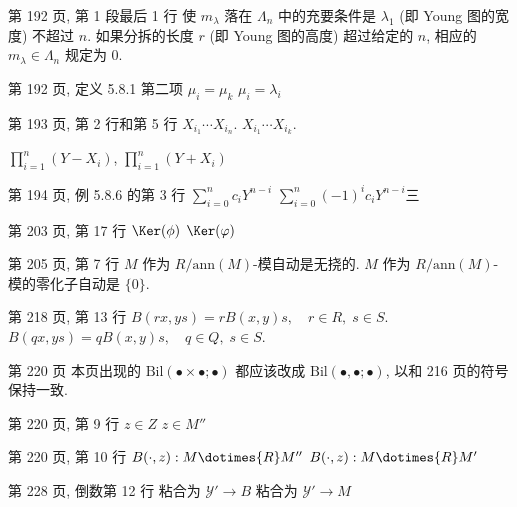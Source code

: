 \documentclass{AJerrata}
\begin{document}
\begin{Errata}
		\item[第 192 页, 第 1 段最后 1 行]
		\Orig 使 $m_\lambda$ 落在 $\Lambda_n$ 中的充要条件是 $\lambda_1$ (即 Young 图的宽度) 不超过 $n$.
		\Corr 如果分拆的长度 $r$ (即 Young 图的高度) 超过给定的 $n$, 相应的 $m_\lambda \in \Lambda_n$ 规定为 $0$.
		
		\item[第 192 页, 定义 5.8.1 第二项]
		\Orig $\mu_i = \mu_k$
		\Corr $\mu_i = \lambda_i$
		
		\item[第 193 页, 第 2 行和第 5 行]
		\Orig $X_{i_1} \cdots X_{i_n}$.
		\Corr $X_{i_1} \cdots X_{i_k}$.
		
		\Orig $\prod_{i=1}^n (Y - X_i)$,
		\Corr $\prod_{i=1}^n (Y + X_i)$
				
		\item[第 194 页, 例 5.8.6 的第 3 行]
		\Orig $\sum_{i=0}^n c_i Y^{n-i}$
		\Corr $\sum_{i=0}^n (-1)^i c_i Y^{n-i}$三
		
		\item[第 203 页, 第 17 行]
		\Orig $\Ker(\phi)$
		\Corr $\Ker(\varphi)$

   		\item[第 205 页, 第 7 行]
		\Orig $M$ 作为 $R/\mathrm{ann}(M)$-模自动是无挠的.
		\Corr $M$ 作为 $R/\mathrm{ann}(M)$-模的零化子自动是 $\{0\}$.

        \item[第 218 页, 第 13 行]
        \Orig $B(rx, ys) = rB(x,y)s, \quad r \in R, \; s \in S$.
        \newline
        \Corr $B(qx, ys) = qB(x,y)s, \quad q \in Q, \; s \in S$.

        \item[第 220 页]
        本页出现的 $\mathrm{Bil}(\bullet \times \bullet; \bullet)$ 都应该改成 $\mathrm{Bil}(\bullet, \bullet; \bullet)$, 以和 216 页的符号保持一致.
        
        \item[第 220 页, 第 9 行]
        \Orig $z \in Z$
        \Corr $z \in M''$
        
        \item[第 220 页, 第 10 行]
        \Orig $B(\cdot, z): M \dotimes{R} M''$
        \Corr $B(\cdot, z): M \dotimes{R} M'$
        
        \item[第 228 页, 倒数第 12 行]
        \Orig 粘合为 $\mathcal{Y}' \to B$
        \Corr 粘合为 $\mathcal{Y}' \to M$
       

\end{Errata}
\end{document}
